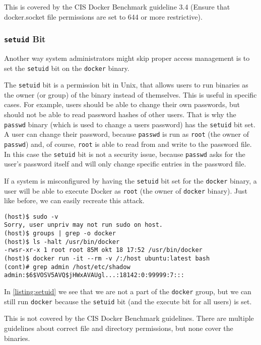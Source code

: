 \medskip

This is covered by the CIS Docker Benchmark guideline 3.4 (Ensure that docker.socket file permissions are set to 644 or more restrictive).

\subsubsection{\texorpdfstring{\lstinline{setuid}}{setuid} Bit}\label{subsubsection:setuid}
Another way system administrators might skip proper access management is to set the \lstinline{setuid} bit on the \lstinline{docker} binary.

\medskip

The \lstinline{setuid} bit is a permission bit in Unix, that allows users to run binaries as the owner (or group) of the binary instead of themselves.
This is useful in specific cases. For example, users should be able to change their own passwords, but should not be able to read password hashes of other users. That is why the \lstinline{passwd} binary (which is used to change a users password) has the \lstinline{setuid} bit set. A user can change their password, because \lstinline{passwd} is run as \lstinline{root} (the owner of \lstinline{passwd}) and, of course, \lstinline{root} is able to read from and write to the password file. In this case the \lstinline{setuid} bit is not a security issue, because \lstinline{passwd} asks for the user's password itself and will only change specific entries in the password file.

\medskip

If a system is misconfigured by having the \lstinline{setuid} bit set for the \lstinline{docker} binary, a user will be able to execute Docker as \lstinline{root} (the owner of \lstinline{docker} binary). Just like before, we can easily recreate this attack.

\begin{lstlisting}[caption={Docker \lstinline{setuid} exploit example.},captionpos=b, label={listing:setuid}]
(host)$ sudo -v
Sorry, user unpriv may not run sudo on host.
(host)$ groups | grep -o docker
(host)$ ls -halt /usr/bin/docker
-rwsr-xr-x 1 root root 85M okt 18 17:52 /usr/bin/docker
(host)$ docker run -it --rm -v /:/host ubuntu:latest bash
(cont)# grep admin /host/etc/shadow
admin:$6$VOSV5AVQ$jHWxAVAUgl...:18142:0:99999:7:::
\end{lstlisting}

In \autoref{listing:setuid} we see that we are not a part of the \lstinline{docker} group, but we can still run \lstinline{docker} because the \lstinline{setuid} bit (and the execute bit for all users) is set.

\medskip

This is not covered by the CIS Docker Benchmark guidelines. There are multiple guidelines about correct file and directory permissions, but none cover the binaries.
